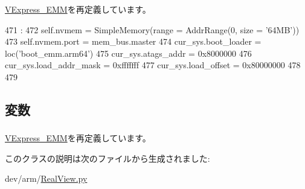 \hyperlink{classRealView_1_1VExpress__EMM_a2bb8c2dabea2e4801ca416188787ef11}{VExpress\_\-EMM}を再定義しています。


\begin{DoxyCode}
471                                                     :
472         self.nvmem = SimpleMemory(range = AddrRange(0, size = '64MB'))
473         self.nvmem.port = mem_bus.master
474         cur_sys.boot_loader = loc('boot_emm.arm64')
475         cur_sys.atags_addr = 0x8000000
476         cur_sys.load_addr_mask = 0xfffffff
477         cur_sys.load_offset = 0x80000000
478 
479 

\end{DoxyCode}


\subsection{変数}
\hypertarget{classRealView_1_1VExpress__EMM64_abcf52781f9ca2926e1f879ceecb4865c}{
\subsubsection[{nvmem}]{}}
\label{classRealView_1_1VExpress__EMM64_abcf52781f9ca2926e1f879ceecb4865c}


\hyperlink{classRealView_1_1VExpress__EMM_abcf52781f9ca2926e1f879ceecb4865c}{VExpress\_\-EMM}を再定義しています。

このクラスの説明は次のファイルから生成されました:\begin{DoxyCompactItemize}
\item 
dev/arm/\hyperlink{RealView_8py}{RealView.py}\end{DoxyCompactItemize}
